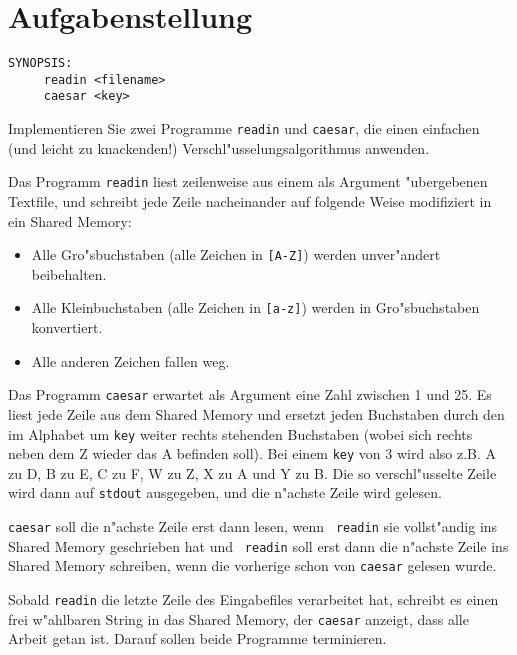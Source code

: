 




\section*{Aufgabenstellung}

\begin{verbatim}
SYNOPSIS:
     readin <filename>
     caesar <key>
\end{verbatim} 

Implementieren Sie zwei Programme {\tt readin} und {\tt caesar}, die
einen einfachen (und leicht zu knackenden!)
Verschl"usselungsalgorithmus anwenden.

Das Programm {\tt readin} liest zeilenweise aus einem als Argument
"ubergebenen Textfile, und schreibt jede Zeile nacheinander auf
folgende Weise modifiziert in ein Shared Memory:
\begin{itemize}
\item Alle Gro"sbuchstaben (alle Zeichen in {\tt [A-Z]}) werden
unver"andert beibehalten.
\item Alle Kleinbuchstaben (alle Zeichen in {\tt [a-z]}) werden in
Gro"sbuchstaben konvertiert.
\item Alle anderen Zeichen fallen weg.
\end{itemize}
Das Programm {\tt caesar} erwartet als Argument eine Zahl zwischen 1
und 25. Es liest jede Zeile aus dem Shared Memory und ersetzt jeden
Buchstaben durch den im Alphabet um {\tt key} weiter rechts stehenden
Buchstaben (wobei sich rechts neben dem Z wieder das A befinden
soll). Bei einem {\tt key} von 3 wird also z.B. A zu D, B zu E, C zu
F, W zu Z, X zu A und Y zu B. Die so verschl"usselte Zeile wird dann
auf {\tt stdout} ausgegeben, und die n"achste Zeile wird gelesen.

{\tt caesar} soll die n"achste Zeile erst dann lesen, wenn {\tt
readin} sie vollst"andig ins Shared Memory geschrieben hat und {\tt
readin} soll erst dann die n"achste Zeile ins Shared Memory schreiben,
wenn die vorherige schon von {\tt caesar} gelesen wurde.

Sobald {\tt readin} die letzte Zeile des Eingabefiles verarbeitet hat,
schreibt es einen frei w"ahlbaren String in das Shared Memory, der
{\tt caesar} anzeigt, dass alle Arbeit getan ist. Darauf sollen beide
Programme terminieren.



